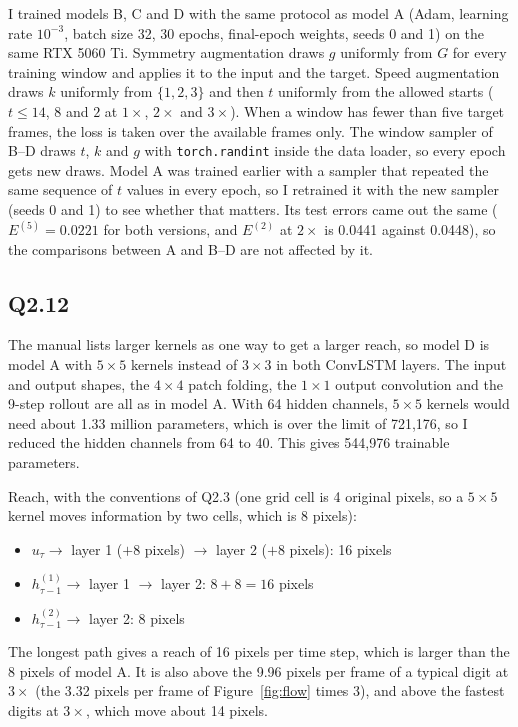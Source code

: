 \documentclass[11pt,letterpaper]{article}
\begin{document}
I trained models B, C and D with the same protocol as model A (Adam, learning rate $10^{-3}$, batch size 32,
30 epochs, final-epoch weights, seeds 0 and 1) on the same RTX 5060 Ti. Symmetry augmentation draws $g$
uniformly from $G$ for every training window and applies it to the input and the target. Speed augmentation
draws $k$ uniformly from $\{1,2,3\}$ and then $t$ uniformly from the allowed starts ($t\le14$, $8$ and $2$ at
$1\times$, $2\times$ and $3\times$). When a window has fewer than five target frames, the loss is taken over the
available frames only. The window sampler of B--D draws $t$, $k$ and $g$ with \texttt{torch.randint} inside the
data loader, so every epoch gets new draws. Model A was trained earlier with a sampler that repeated the same
sequence of $t$ values in every epoch, so I retrained it with the new sampler (seeds 0 and 1) to see whether
that matters. Its test errors came out the same ($E^{(5)}=0.0221$ for both versions, and $E^{(2)}$ at $2\times$
is 0.0441 against 0.0448), so the comparisons between A and B--D are not affected by it.

\subsection*{Q2.12}

The manual lists larger kernels as one way to get a larger reach, so model D is model A with $5\times5$ kernels
instead of $3\times3$ in both ConvLSTM layers. The input and output shapes, the $4\times4$ patch folding, the
$1\times1$ output convolution and the 9-step rollout are all as in model A. With 64 hidden channels, $5\times5$
kernels would need about 1.33 million parameters, which is over the limit of 721,176, so I reduced the hidden
channels from 64 to 40. This gives 544,976 trainable parameters.

Reach, with the conventions of Q2.3 (one grid cell is 4 original pixels, so a $5\times5$ kernel moves information
by two cells, which is 8 pixels):
\begin{itemize}
  \item $u_\tau \to$ layer 1 ($+8$ pixels) $\to$ layer 2 ($+8$ pixels): 16 pixels
  \item $h^{(1)}_{\tau-1} \to$ layer 1 $\to$ layer 2: $8+8=16$ pixels
  \item $h^{(2)}_{\tau-1} \to$ layer 2: $8$ pixels
\end{itemize}
The longest path gives a reach of 16 pixels per time step, which is larger than the 8 pixels of model A. It
is also above the 9.96 pixels per frame of a typical digit at $3\times$ (the 3.32 pixels per frame of
Figure~\ref{fig:flow} times 3), and above the fastest digits at $3\times$, which move about 14 pixels.
\end{document}
